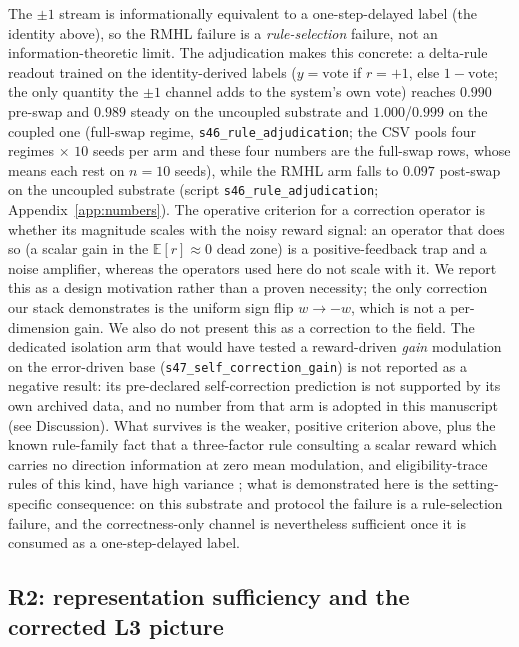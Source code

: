 \documentclass[preprint,12pt]{elsarticle}
\begin{document}
The $\pm1$ stream is informationally equivalent to a one-step-delayed label
(the identity above), so the RMHL failure is a
\emph{rule-selection} failure, not an information-theoretic limit.
The adjudication makes this concrete: a delta-rule readout trained on the
identity-derived labels ($y=\mathrm{vote}$ if $r=+1$, else $1-\mathrm{vote}$;
the only quantity the $\pm1$ channel adds to the system's own vote) reaches
$0.990$ pre-swap and $0.989$ steady on the uncoupled substrate and
$1.000$/$0.999$ on the coupled one (full-swap regime,
\texttt{s46\_rule\_adjudication}; the CSV pools four regimes $\times$ $10$
seeds per arm and these four numbers are the full-swap rows, whose means
each rest on $n=10$ seeds), while the RMHL arm falls to $0.097$
post-swap on the uncoupled substrate (script \texttt{s46\_rule\_adjudication};
Appendix~\ref{app:numbers}). The
operative criterion for a correction operator is whether its magnitude
scales with the noisy reward signal: an operator that does so (a scalar gain
in the $\mathbb E[r]\approx0$ dead zone) is a positive-feedback trap and a
noise amplifier, whereas the operators used here do not scale with it. We
report this as a design motivation rather than a proven necessity; the
only correction our stack demonstrates is the uniform sign flip $w\to-w$,
which is not a per-dimension gain. We also do not present this as a correction
to the field. The dedicated isolation arm that would have tested a
reward-driven \emph{gain} modulation on the error-driven base
(\texttt{s47\_self\_correction\_gain}) is not reported as a negative
result: its pre-declared self-correction prediction is not supported by
its own archived data, and no number from that arm is adopted in this
manuscript (see Discussion). What survives is
the weaker, positive criterion above, plus the known rule-family fact that a
three-factor rule consulting a scalar reward which carries no direction
information at zero mean modulation, and eligibility-trace rules of this
kind, have high variance
\cite{pfister2006,hoerzer2014}; what is demonstrated here is
the setting-specific consequence: on this substrate and protocol the
failure is a rule-selection failure, and the correctness-only channel is
nevertheless sufficient once it is consumed as a one-step-delayed label.

\subsection{R2: representation sufficiency and the corrected L3 picture}
\label{sec:r2}
\end{document}
